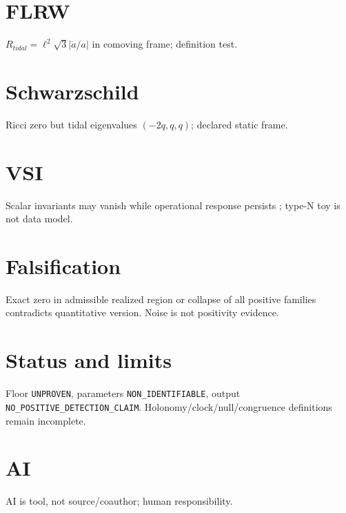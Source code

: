 \documentclass[11pt,a4paper]{article}\usepackage[utf8]{inputenc}\usepackage[T1]{fontenc}\usepackage[english]{babel}\usepackage{amsmath,amssymb,geometry,hyperref}\geometry{margin=2.7cm}
\begin{document}
\section{FLRW}\label{sec:st-flrw}$R_{tidal}=\ell^2\sqrt3|\ddot a/a|$ in comoving frame; definition test.
\section{Schwarzschild}\label{sec:st-schwarzschild}Ricci zero but tidal eigenvalues $(-2q,q,q)$; declared static frame.
\section{VSI}\label{sec:st-vsi}Scalar invariants may vanish while operational response persists \cite{PelavasEtAl2005}; type-N toy is not data model.
\section{Falsification}\label{sec:st-falsification}Exact zero in admissible realized region or collapse of all positive families contradicts quantitative version. Noise is not positivity evidence.
\section{Status and limits}\label{sec:st-status}Floor \texttt{UNPROVEN}, parameters \texttt{NON\_IDENTIFIABLE}, output \texttt{NO\_POSITIVE\_DETECTION\_CLAIM}. Holonomy/clock/null/congruence definitions remain incomplete.
\section{AI}\label{sec:st-ai}AI is tool, not source/coauthor; human responsibility.

\end{document}
